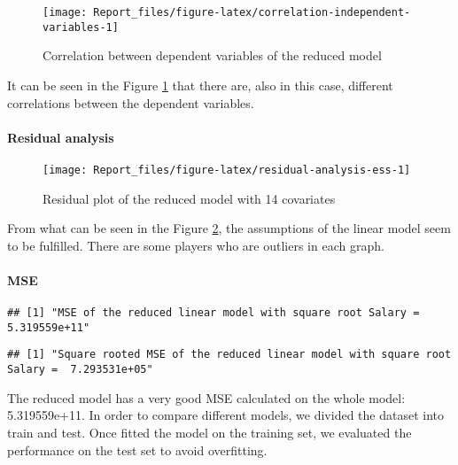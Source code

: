 \documentclass[
]{article}
\begin{document}
\begin{figure}

{\centering \texttt{[image: Report\_files/figure-latex/correlation-independent-variables-1]} 

}

\caption{Correlation between dependent variables of the reduced model \label{fig:correlation-independent-variables}}\label{fig:correlation-independent-variables}
\end{figure}

It can be seen in the Figure \ref{fig:correlation-independent-variables}
that there are, also in this case, different correlations between the
dependent variables.

\hypertarget{residual-analysis}{%
\paragraph{Residual analysis}\label{residual-analysis}}

\begin{figure}

{\centering \texttt{[image: Report\_files/figure-latex/residual-analysis-ess-1]} 

}

\caption{Residual plot of the reduced model with 14 covariates \label{fig:residual-analysis-ess}}\label{fig:residual-analysis-ess}
\end{figure}

From what can be seen in the Figure \ref{fig:residual-analysis-ess}, the
assumptions of the linear model seem to be fulfilled. There are some
players who are outliers in each graph.

\hypertarget{mse}{%
\paragraph{MSE}\label{mse}}

\begin{verbatim}
## [1] "MSE of the reduced linear model with square root Salary =  5.319559e+11"
\end{verbatim}

\begin{verbatim}
## [1] "Square rooted MSE of the reduced linear model with square root Salary =  7.293531e+05"
\end{verbatim}

The reduced model has a very good MSE calculated on the whole model:
5.319559e+11. In order to compare different models, we divided the
dataset into train and test. Once fitted the model on the training set,
we evaluated the performance on the test set to avoid overfitting.
\end{document}
